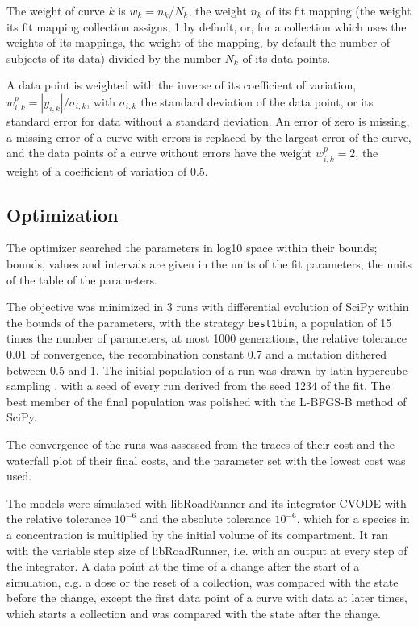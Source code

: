 The weight of curve $k$ is $w_k = n_k / N_k$, the weight $n_k$ of its fit mapping (the weight its fit mapping collection assigns, 1 by default, or, for a collection which uses the weights of its mappings, the weight of the mapping, by default the number of subjects of its data) divided by the number $N_k$ of its data points.

A data point is weighted with the inverse of its coefficient of variation, $w^{p}_{i,k} = |y_{i,k}| / \sigma_{i,k}$, with $\sigma_{i,k}$ the standard deviation of the data point, or its standard error for data without a standard deviation. An error of zero is missing, a missing error of a curve with errors is replaced by the largest error of the curve, and the data points of a curve without errors have the weight $w^{p}_{i,k} = 2$, the weight of a coefficient of variation of 0.5.

\subsection{Optimization}

The optimizer searched the parameters in log10 space within their bounds; bounds, values and intervals are given in the units of the fit parameters, the units of the table of the parameters.

The objective was minimized in 3 runs with differential evolution \cite{Storn1997} of SciPy \cite{Virtanen2020} within the bounds of the parameters, with the strategy \texttt{best1bin}, a population of 15 times the number of parameters, at most 1000 generations, the relative tolerance 0.01 of convergence, the recombination constant 0.7 and a mutation dithered between 0.5 and 1. The initial population of a run was drawn by latin hypercube sampling \cite{McKay1979}, with a seed of every run derived from the seed 1234 of the fit. The best member of the final population was polished with the L-BFGS-B method of SciPy.

The convergence of the runs was assessed from the traces of their cost and the waterfall plot of their final costs, and the parameter set with the lowest cost was used.

The models were simulated with libRoadRunner \cite{Welsh2023} and its integrator CVODE \cite{Hindmarsh2005} with the relative tolerance $10^{-6}$ and the absolute tolerance $10^{-6}$, which for a species in a concentration is multiplied by the initial volume of its compartment. It ran with the variable step size of libRoadRunner, i.e. with an output at every step of the integrator. A data point at the time of a change after the start of a simulation, e.g. a dose or the reset of a collection, was compared with the state before the change, except the first data point of a curve with data at later times, which starts a collection and was compared with the state after the change.

